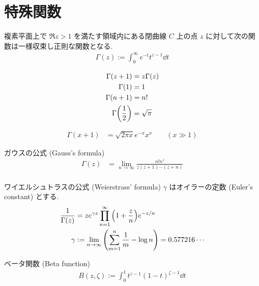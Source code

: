 \documentclass[uplatex,dvipdfmx,a4paper,11pt]{jlreq}
\theoremstyle{definition}
\begin{document}
\section{特殊関数}
\begin{definition}
  複素平面上で $\Re z > 1$ を満たす領域内にある閉曲線 $C$ 上の点 $z$ に対して次の関数は一様収束し正則な関数となる.
  \begin{align}
    \Gamma(z) := \int_0^\infty e^{-t}t^{z-1}\dd{t}
  \end{align}
\end{definition}

\begin{proposition}
  \begin{align}
    \Gamma(z + 1)           & = z\Gamma(z) \\
    \Gamma(1)               & = 1          \\
    \Gamma(n + 1)           & = n!         \\
    \Gamma\qty(\frac{1}{2}) & = \sqrt{\pi}
  \end{align}
\end{proposition}

\begin{proposition}
  \begin{align}
    \Gamma(x + 1) & = \sqrt{2\pi x}e^{-x}x^x \qquad (x \gg 1)
  \end{align}
\end{proposition}

\begin{proposition}
  ガウスの公式 (Gauss's formula)
  \begin{align}
    \Gamma(z) & = \lim_{n\to\infty}\frac{n!n^z}{z(z+1)\cdots(z+n)} \\
  \end{align}
\end{proposition}
\begin{proposition}
  ワイエルシュトラスの公式 (Weierstrass' formula) $\gamma$ はオイラーの定数 (Euler's constant) とする.
  \begin{align}
    \frac{1}{\Gamma(z)} & = ze^{\gamma z}\prod_{n=1}^{\infty}\qty(1 + \frac{z}{n})e^{-z/n}              \\
    \gamma              & := \lim_{n\to\infty}\qty(\sum_{m=1}^{n}\frac{1}{m} - \log n) = 0.577216\cdots
  \end{align}
\end{proposition}

\begin{definition}
  ベータ関数 (Beta function)
  \begin{align}
    B(z, \zeta) := \int_{0}^{1}t^{z-1}(1-t)^{\zeta-1}\dd{t}
  \end{align}
\end{definition}
\end{document}
